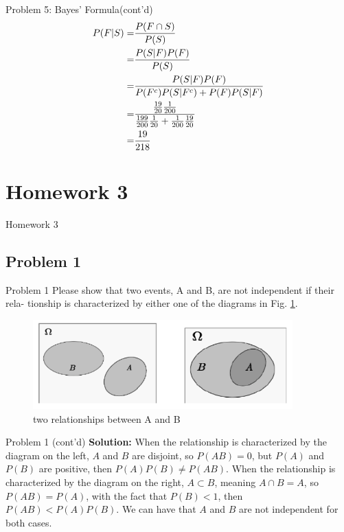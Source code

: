 \documentclass{beamer}
\begin{document}
\begin{frame}{Problem 5: Bayes' Formula(cont'd)}
    \begin{align}
        P(F|S)=&\frac{P(F\cap S)}{P(S)}\notag\\
        =&\frac{P(S|F)P(F)}{P(S)}\notag\\
        =&\frac{P(S|F)P(F)}{P(F^c)P(S|F^c)+P(F)P(S|F)}\notag\\
        =&\frac{\frac{19}{20}\frac{1}{200}}{\frac{199}{200}\frac{1}{20}+\frac{1}{200}\frac{19}{20}}\notag\\
        =&\frac{19}{218}\notag
    \end{align}
\end{frame}

\section{Homework 3}
\begin{frame}
\center \huge Homework 3
\end{frame}

\subsection{Problem 1}
\begin{frame}{Problem 1}
Please show that two events, A and B, are not independent if their rela- tionship is characterized by either one of the diagrams in Fig. \ref{fig1}.
\begin{figure}
\includegraphics[width=10cm]{fig1}
\caption{\label{fig1}two relationships between A and B}
\end{figure}
\end{frame}

\begin{frame}{Problem 1 (cont'd)}
\textbf{Solution:}
When the relationship is characterized by the diagram on the left, $A$ and $B$ are disjoint, so $P(AB) = 0$, but $P(A)$ and $P(B)$ are positive, then $P(A)P(B)\neq P(AB)$.
\vspace{0.2cm}
When the relationship is characterized by the diagram on the right, $A\subset B$, meaning $A\cap B = A$, so $P(AB) = P(A)$, with the fact that $P(B) < 1$, then $P(AB) < P(A)P(B)$.
\vspace{0.2cm}
We can have that $A$ and $B$ are not independent for both cases.
\vspace{4cm}
\end{frame}
\end{document}
